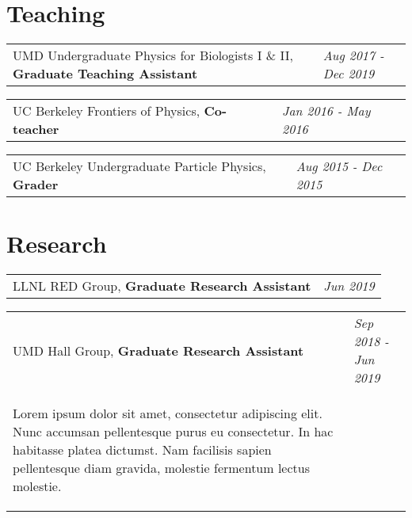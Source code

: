\documentclass[
  10pt,
  letterpaper,
  DIV=11,
  numbers=noendperiod]{scrartcl}
\begin{document}
\hypertarget{fa-school-teaching}{%
\section{\texorpdfstring{
Teaching}{ Teaching}}\label{fa-school-teaching}}

\begin{tabularx}{\textwidth}{>{\RaggedRight}p{}  >{\RaggedLeft}X} UMD Undergraduate Physics for Biologists I \& II, \textbf{Graduate Teaching Assistant} & \textcolor{mygray}{\textit{Aug 2017 - Dec 2019}}  \end{tabularx}

\begin{tabularx}{\textwidth}{>{\RaggedRight}p{}  >{\RaggedLeft}X} UC Berkeley Frontiers of Physics, \textbf{Co-teacher} & \textcolor{mygray}{\textit{Jan 2016 - May 2016}}  \end{tabularx}

\begin{tabularx}{\textwidth}{>{\RaggedRight}p{}  >{\RaggedLeft}X} UC Berkeley Undergraduate Particle Physics, \textbf{Grader} & \textcolor{mygray}{\textit{Aug 2015 - Dec 2015}}  \end{tabularx}

\hypertarget{fa-atom-research}{%
\section{\texorpdfstring{
Research}{ Research}}\label{fa-atom-research}}

\begin{tabularx}{\textwidth}{>{\RaggedRight}p{}  >{\RaggedLeft}X} LLNL RED Group, \textbf{Graduate Research Assistant} & \textcolor{mygray}{\textit{Jun 2019}}  \end{tabularx}

\begin{tabularx}{\textwidth}{>{\RaggedRight}p{}  >{\RaggedLeft}X} UMD Hall Group, \textbf{Graduate Research Assistant} & \textcolor{mygray}{\textit{Sep 2018 - Jun 2019}} \\ \begin{quoting} \vspace{-0.7\baselineskip} Lorem ipsum dolor sit amet, consectetur adipiscing elit. Nunc accumsan pellentesque purus eu consectetur. In hac habitasse platea dictumst. Nam facilisis sapien pellentesque diam gravida, molestie fermentum lectus molestie. \vspace{-\baselineskip} \end{quoting} \end{tabularx}
\end{document}
